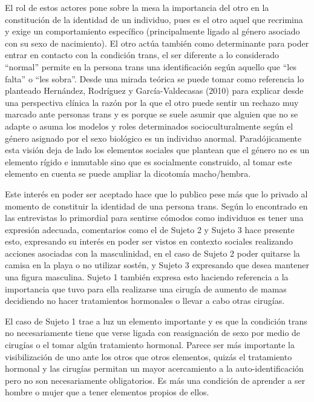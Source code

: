 El rol de estos actores pone sobre la mesa la importancia del otro en la
constitución de la identidad de un individuo, pues es el otro aquel que
recrimina y exige un comportamiento específico (principalmente ligado al género
asociado con su sexo de nacimiento). El otro actúa también como determinante
para poder entrar en contacto con la condición trans, el ser diferente a lo
considerado “normal” permite en la persona trans una identificación según
aquello que “les falta” o “les sobra”. Desde una mirada teórica se puede tomar
como referencia lo planteado Hernández, Rodríguez y García-Valdecasas (2010)
para explicar desde una perspectiva clínica la razón por la que el otro puede
sentir un rechazo muy marcado ante personas trans y es porque se suele asumir
que alguien que no se adapte o asuma los modelos y roles determinados
socioculturalmente según el género asignado por el sexo biológico es un
individuo anormal. Paradójicamente esta visión deja de lado los elementos
sociales que plantean que el género no es un elemento rígido e inmutable sino
que es socialmente construido, al tomar este elemento en cuenta se puede ampliar
la dicotomía macho/hembra.

Este interés en poder ser aceptado hace que lo publico pese más que lo privado
al momento de constituir la identidad de una persona trans. Según lo encontrado
en las entrevistas lo primordial para sentirse cómodos como individuos es tener
una expresión adecuada, comentarios como el de Sujeto 2 y Sujeto 3 hace presente
esto, expresando su interés en poder ser vistos en contexto sociales realizando
acciones asociadas con la masculinidad, en el caso de Sujeto 2 poder quitarse la
camisa en la playa o no utilizar sostén, y Sujeto 3 expresando que desea
mantener una figura masculina. Sujeto 1 también expresa esto haciendo referencia
a la importancia que tuvo para ella realizarse una cirugía de aumento de mamas
decidiendo no hacer tratamientos hormonales o llevar a cabo otras cirugías.

El caso de Sujeto 1 trae a luz un elemento importante y es que la condición
trans no necesariamente tiene que verse ligada con reasignación de sexo por
medio de cirugías o el tomar algún tratamiento hormonal. Parece ser más
importante la visibilización de uno ante los otros que otros elementos, quizás
el tratamiento hormonal y las cirugías permitan un mayor acercamiento a la
auto-identificación pero no son necesariamente obligatorios. Es más una
condición de aprender a ser hombre o mujer que a tener elementos propios de
ellos.

